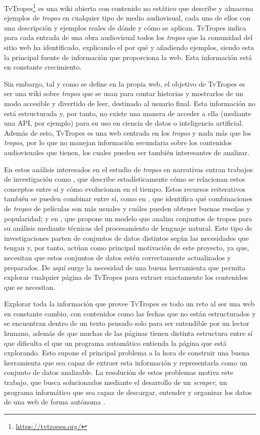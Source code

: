 TvTropes\footnote{\url{https://tvtropes.org/}} es una wiki abierta con contenido
no estático que describe y almacena ejemplos de \textit{tropos} en cualquier
tipo de medio audiovisual, cada uno de ellos con una descripción y ejemplos
reales de dónde y cómo se aplican. TvTropes indica para cada entrada de una obra
audiovisual todos los \textit{tropos} que la comunidad del sitio web ha
identificado, explicando el por qué y añadiendo ejemplos, siendo esta la
principal fuente de información que proporciona la web. Esta información está en
constante crecimiento.

Sin embargo, tal y como se define en la propia web, el objetivo de TvTropes es
ser una wiki sobre \textit{tropos} que se usan para contar historias y
mostrarlos de un modo accesible y divertido de leer, destinado al usuario final.
Esta información no está estructurada y, por tanto, no existe una manera de
acceder a ella (mediante una API, por ejemplo) para su uso en ciencia de datos o
inteligencia artificial. Además de esto, TvTropes es una web centrada en los
\textit{tropos} y nada más que los \textit{tropos}, por lo que no manejan
información secundaria sobre los contenidos audiovisuales que tienen, los cuales
pueden ser también interesantes de analizar.

En estos análisis interesados en el estudio de \textit{tropos} en narrativas
entran trabajos de investigación como \cite{garcia2020tropes}, que describe
estadísticamente cómo se relacionan estos conceptos entre sí y cómo evolucionan
en el tiempo. Estos recursos reiterativos también se pueden combinar entre sí,
como en \cite{garcia2021simpsons}, que identifica qué combinaciones de
\textit{tropos} de películas son más usuales y cuáles pueden obtener buenas
reseñas y popularidad; y en \cite{any2vec}, que propone un modelo que analiza
conjuntos de tropos para su análisis mediante técnicas del procesamiento de
lenguaje natural. Este tipo de investigaciones parten de conjuntos de datos
distintos según las necesidades que tengan y, por tanto, actúan como principal
motivación de este proyecto, ya que, necesitan que estos conjuntos de datos
estén correctamente actualizados y preparados. De aquí surge la necesidad de una
buena herramienta que permita explorar cualquier página de TvTropes para extraer
exactamente los contenidos que se necesitan.

Explorar toda la información que provee TvTropes es todo un reto al ser una web
en constante cambio, con contenidos como las fechas que no están estructurados y
se encuentran dentro de un texto pensado solo para ser entendible por un lector
humano, además de que muchas de las páginas tienen distinta estructura entre sí
que dificulta el que un programa automático entienda la página que está
explorando. Esto supone el principal problema a la hora de construir una buena
herramienta que sea capaz de extraer esta información y representarla como un
conjunto de datos analizable. La resolución de estos problemas motiva este
trabajo, que busca solucionarlos mediante el desarrollo de un \textit{scraper},
un programa informático que sea capaz de descargar, entender y organizar los
datos de una web de forma autónoma \cite{apress2018scraping}.

